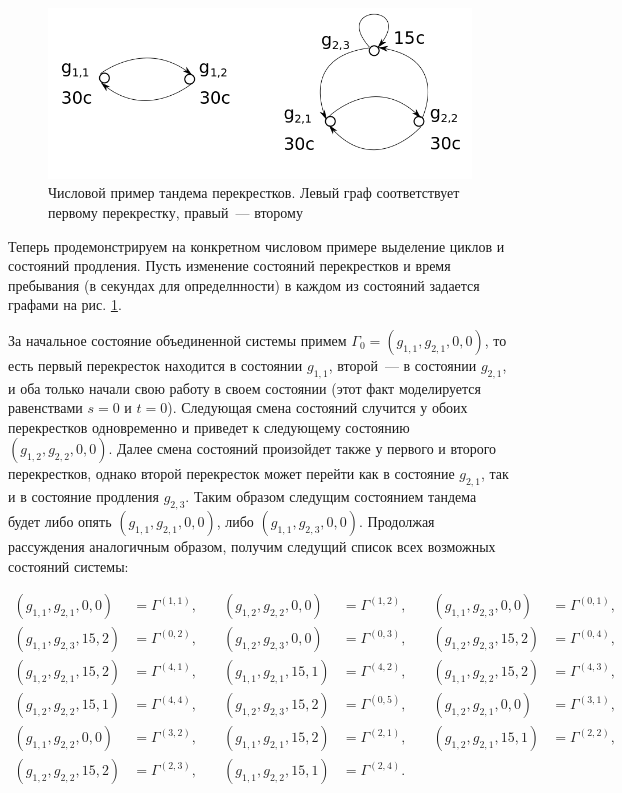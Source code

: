 \documentclass[a4paper,twoside]{article}
\theoremstyle{theorem}
\theoremstyle{remark}
\begin{document}
\begin{figure}[t]
\includegraphics[scale=0.5]{SystemStates.png} 
\caption{Числовой пример тандема перекрестков. Левый граф соответствует первому перекрестку, правый~--- второму}
\label{SystemStates}
\end{figure}

Теперь продемонстрируем на конкретном числовом примере выделение циклов и состояний продления. Пусть изменение состояний перекрестков и время пребывания (в секундах для определнности) в каждом из состояний задается графами на рис. \ref{SystemStates}.



За начальное состояние объединенной системы примем $\Gamma_0=(g_{1,1},g_{2,1},0,0)$, то есть первый перекресток находится в состоянии $g_{1,1}$, второй~--- в состоянии $g_{2,1}$, и оба только начали свою работу в своем состоянии (этот факт моделируется равенствами $s=0$ и $t=0$). Следующая смена состояний случится у обоих перекрестков одновременно и приведет к следующему состоянию $(g_{1,2},g_{2,2}, 0, 0)$. Далее смена состояний произойдет также у первого и второго перекрестков, однако второй перекресток может перейти как в состояние $g_{2,1}$, так и в состояние продления $g_{2,3}$. Таким образом следущим состоянием тандема будет либо опять $(g_{1,1},g_{2,1},0,0)$, либо $(g_{1,1},g_{2,3},0,0)$. Продолжая рассуждения аналогичным образом, получим следущий список всех возможных состояний системы:

\begin{align*}
(g_{1,1},g_{2,1},0,0)&=\Gamma^{(1,1)} ,& \quad (g_{1,2},g_{2,2},0,0)&=\Gamma^{(1,2)} ,& \quad (g_{1,1},g_{2,3},0,0)&=\Gamma^{(0,1)}, \\
(g_{1,1},g_{2,3},15,2)&=\Gamma^{(0,2)} ,& \quad (g_{1,2},g_{2,3},0,0)&=\Gamma^{(0,3)} ,& \quad (g_{1,2},g_{2,3},15,2)&=\Gamma^{(0,4)}, \\
(g_{1,2},g_{2,1},15,2)&=\Gamma^{(4,1)} ,& \quad (g_{1,1},g_{2,1},15,1)&=\Gamma^{(4,2)} ,& \quad (g_{1,1},g_{2,2},15,2)&=\Gamma^{(4,3)}, \\
(g_{1,2},g_{2,2},15,1)&=\Gamma^{(4,4)} ,& \quad (g_{1,2},g_{2,3},15,2)&=\Gamma^{(0,5)} ,& \quad (g_{1,2},g_{2,1},0,0)&=\Gamma^{(3,1)}, \\
(g_{1,1},g_{2,2},0,0)&=\Gamma^{(3,2)} ,& \quad (g_{1,1},g_{2,1},15,2)&=\Gamma^{(2,1)} ,& \quad (g_{1,2},g_{2,1},15,1)&=\Gamma^{(2,2)}, \\
(g_{1,2},g_{2,2},15,2)&=\Gamma^{(2,3)} ,& \quad (g_{1,1},g_{2,2},15,1)&=\Gamma^{(2,4)}. & &
\end{align*}
\end{document}

